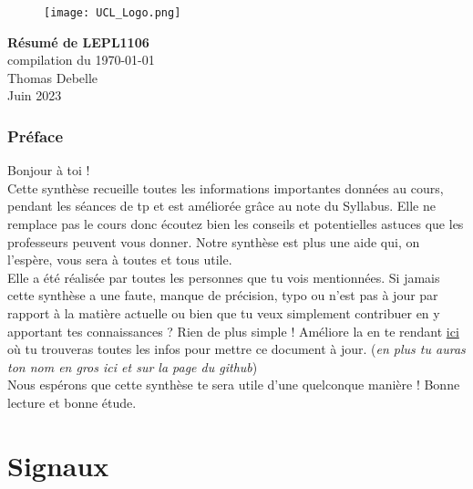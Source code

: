 \documentclass{report}
\begin{document}
\begin{titlepage}
    \begin{figure}
        \texttt{[image: UCL\_Logo.png]}
        \label{fig:my_label}
    \end{figure}

    \hspace*{100cm}
    \centering
    \vspace*{7cm}

    {\Huge \textbf{Résumé de LEPL1106}}\\
    \vspace*{0.25cm}
    compilation du \today\\
    \vspace*{0.25cm}
    \Large{Thomas Debelle}\\

    \vspace*{9.5cm}
    {\Large Juin 2023}
\end{titlepage}


\tableofcontents
\newpage

\section*{Préface}

Bonjour à toi !\\

Cette synthèse recueille toutes les informations importantes données au cours, pendant les séances de tp et est améliorée grâce au note du Syllabus. Elle ne remplace pas le cours donc écoutez bien les conseils et potentielles astuces que les professeurs peuvent vous donner. Notre synthèse est plus une aide qui, on l'espère, vous sera à toutes et tous utile.\\

Elle a été réalisée par toutes les personnes que tu vois mentionnées. Si jamais cette synthèse a une faute, manque de précision, typo ou n'est pas à jour par rapport à la matière actuelle ou bien que tu veux simplement contribuer en y apportant tes connaissances ? Rien de plus simple ! Améliore la en te rendant \href{http://www.github.com/Tfloow/Q4_EPL}{ici} où tu trouveras toutes les infos pour mettre ce document à jour. (\textit{en plus tu auras ton nom en gros ici et sur la page du github})\\

Nous espérons que cette synthèse te sera utile d'une quelconque manière ! Bonne lecture et bonne étude.


\part{Signaux}
\end{document}

